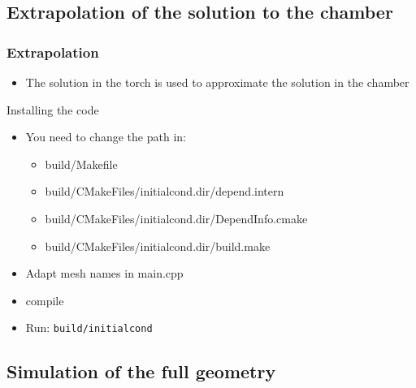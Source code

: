 \documentclass[compress,10pt]{beamer}
\begin{document}
\subsection{Extrapolation of the solution to the chamber}
\begin{frame}

\frametitle{Extrapolation}
\begin{itemize}
 \item The solution in the torch is used to approximate 
the solution in the chamber
\end{itemize}
\begin{block}{Installing the code}
\begin{itemize}
 \item You need to change the path in:
\begin{itemize}
 \item build/Makefile
 \item build/CMakeFiles/initialcond.dir/depend.intern
 \item build/CMakeFiles/initialcond.dir/DependInfo.cmake
 \item build/CMakeFiles/initialcond.dir/build.make
\end{itemize}
\item Adapt mesh names in main.cpp
\item compile
\item Run: \texttt{build/initialcond}
\end{itemize}
\end{block}
  \end{frame}
\subsection{Simulation of the full geometry}
\end{document}
